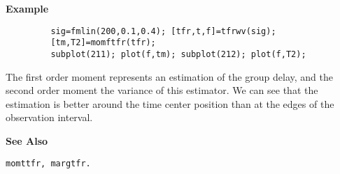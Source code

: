 {\bf \large {}\selectfont Example}\\
\hspace*{1.5cm}
\begin{minipage}[t]{13.5cm}
\begin{verbatim}
         sig=fmlin(200,0.1,0.4); [tfr,t,f]=tfrwv(sig); 
         [tm,T2]=momftfr(tfr); 
         subplot(211); plot(f,tm); subplot(212); plot(f,T2); 
\end{verbatim}
The first order moment represents an estimation of the group delay, and the
second order moment the variance of this estimator. We can see that the
estimation is better around the time center position than at the edges of
the observation interval.
\end{minipage}
\vspace*{.35cm}

{\bf \large {}\selectfont See Also}\\
\hspace*{1.5cm}
\begin{minipage}[t]{13.5cm}
\begin{verbatim}
momttfr, margtfr.
\end{verbatim}
\end{minipage}

